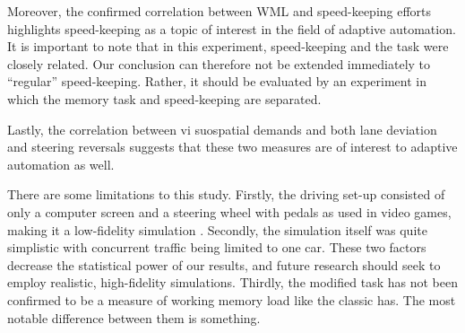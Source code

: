 Moreover, the confirmed correlation between WML and speed-keeping efforts highlights speed-keeping as a topic of interest in the field of adaptive automation.
It is important to note that in this experiment, speed-keeping and the \nback task were closely related.
Our conclusion can therefore not be extended immediately to ``regular'' speed-keeping. 
Rather, it should be evaluated by an experiment in which the memory task and speed-keeping are separated.

Lastly, the correlation between vi suospatial demands and both lane deviation and steering reversals suggests that these two measures are of interest to adaptive automation as well.

There are some limitations to this study. 
Firstly, the driving set-up consisted of only a computer screen and a steering wheel with pedals as used in video games, making it a low-fidelity simulation \citep{Knappe2007}. 
Secondly, the simulation itself was quite simplistic with concurrent traffic being limited to one car.
These two factors decrease the statistical power of our results, and future research should seek to employ realistic, high-fidelity simulations.
Thirdly, the modified \nback task has not been confirmed to be a measure of working memory load like the classic \nback has.
The most notable difference between them is something.